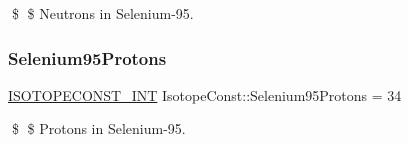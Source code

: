 \$ \$ Neutrons in Selenium-\/95. \mbox{\label{group___isotope_const-_selenium-_se95_gabe9fca570c7b88463b4879ab170fe22c}} 
\subsubsection{\texorpdfstring{Selenium95\+Protons}{Selenium95Protons}}
{\footnotesize\ttfamily \mbox{\hyperlink{group___isotope_const-_macros_ga5f18360b3e99483a35c32d789e62621c}{I\+S\+O\+T\+O\+P\+E\+C\+O\+N\+S\+T\+\_\+\+I\+NT}} Isotope\+Const\+::\+Selenium95\+Protons = 34}

\$ \$ Protons in Selenium-\/95. 